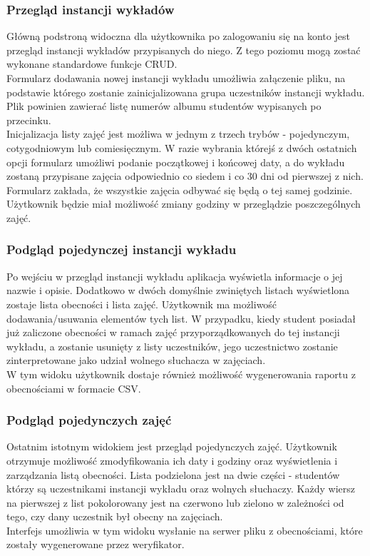 \documentclass[declaration,shortabstract, mgr]{iithesis}
\begin{document}
\subsubsection{Przegląd instancji wykładów}
\indent Główną podstroną widoczna dla użytkownika po zalogowaniu się na konto jest przegląd instancji wykładów przypisanych do niego. Z tego poziomu mogą zostać wykonane standardowe funkcje CRUD\cite{crud}.\\
\indent Formularz dodawania nowej instancji wykładu umożliwia załączenie pliku, na podstawie którego zostanie zainicjalizowana grupa uczestników instancji wykładu. Plik powinien zawierać listę numerów albumu studentów wypisanych po przecinku.\\
\indent Inicjalizacja listy zajęć jest możliwa w jednym z trzech trybów - pojedynczym, cotygodniowym lub comiesięcznym. W razie wybrania którejś z dwóch ostatnich opcji formularz umożliwi podanie początkowej i końcowej daty, a do wykładu zostaną przypisane zajęcia odpowiednio co siedem i co 30 dni od pierwszej z nich. Formularz zakłada, że wszystkie zajęcia odbywać się będą o tej samej godzinie. Użytkownik będzie miał możliwość zmiany godziny w przeglądzie poszczególnych zajęć.\\
\subsubsection{Podgląd pojedynczej instancji wykładu}
\indent Po wejściu w przegląd instancji wykładu aplikacja wyświetla informacje o jej nazwie i opisie. Dodatkowo w dwóch domyślnie zwiniętych listach wyświetlona zostaje lista obecności i lista zajęć. Użytkownik ma możliwość dodawania/usuwania elementów tych list. W przypadku, kiedy student posiadał już zaliczone obecności w ramach zajęć przyporządkowanych do tej instancji wykładu, a zostanie usunięty z listy uczestników, jego uczestnictwo zostanie zinterpretowane jako udział wolnego słuchacza w zajęciach.\\
\indent W tym widoku użytkownik dostaje również możliwość wygenerowania raportu z obecnościami w formacie CSV.\\
\subsubsection{Podgląd pojedynczych zajęć}
\indent Ostatnim istotnym widokiem jest przegląd pojedynczych zajęć. Użytkownik otrzymuje możliwość zmodyfikowania ich daty i godziny oraz wyświetlenia i zarządzania listą obecności. Lista podzielona jest na dwie części - studentów którzy są uczestnikami instancji wykładu oraz wolnych słuchaczy. Każdy wiersz na pierwszej z list pokolorowany jest na czerwono lub zielono w zależności od tego, czy dany uczestnik był obecny na zajęciach. \\
\indent Interfejs umożliwia w tym widoku wysłanie na serwer pliku z obecnościami, które zostały wygenerowane przez weryfikator.\\
\end{document}
